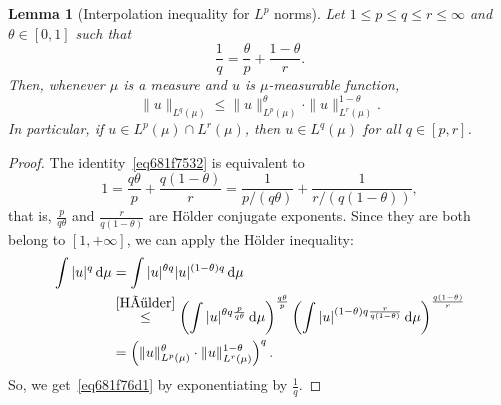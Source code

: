 \documentclass[a4paper,9pt]{amsart}
\newcommand{\did}{\,\mathrm{d}}	%
\theoremstyle{plain}
\newtheorem{lemma}[proposition]{Lemma}
\theoremstyle{definition}
\theoremstyle{remark}
\begin{document}
\begin{lemma}[Interpolation inequality for $L^p$ norms]\label{lem681f73e4}
	Let $1\le p\le q\le r\le \infty$ and $\theta\in[0,1]$ such that
	\begin{equation}\label{eq681f7532}
		\frac1q = \frac\theta p + \frac{1-\theta}r .
	\end{equation}
	Then, whenever $\mu$ is a measure and $u$ is $\mu$-measurable function,
	\begin{equation}\label{eq681f76d1}
		\|u\|_{L^q(\mu)} \le \|u\|_{L^p(\mu)}^{\theta} \cdot \|u\|_{L^r(\mu)}^{1-\theta} .
	\end{equation}
	In particular, if $u\in L^p(\mu)\cap L^r(\mu)$, then $u\in L^q(\mu)$ for all $q\in[p,r]$.
\end{lemma}
\begin{proof}
	The identity~\eqref{eq681f7532} is equivalent to
	\begin{equation}
		1 = \frac{q\theta}{p} + \frac{q(1-\theta)}{r}
		= \frac{1}{p/(q\theta)} + \frac{1}{r/(q(1-\theta))} ,
	\end{equation}
	that is, $\frac{p}{q\theta}$ and $\frac{r}{q(1-\theta)}$ are Hölder conjugate exponents.
	Since they are both belong to $[1,+\infty]$, we can apply the Hölder inequality:
	\begin{align}
		\int |u|^q \did \mu
		&= \int |u|^{\theta q} |u|^{(1-\theta)q} \did \mu  \\
		&\overset{\eqref{Hölder}}\le \left( \int |u|^{\theta q \frac{p}{q\theta}} \did \mu \right)^{\frac{q\theta}{p}}
			\left( \int |u|^{(1-\theta)q\frac{r}{q(1-\theta)}} \did \mu \right)^{\frac{q(1-\theta)}{r}} \\
		&= \left( \|u\|_{L^p(\mu)}^{\theta} \cdot \|u\|_{L^r(\mu)}^{1-\theta} \right)^{q} .
	\end{align}
	So, we get~\eqref{eq681f76d1} by exponentiating by $\frac1q$.
\end{proof}
\end{document}
